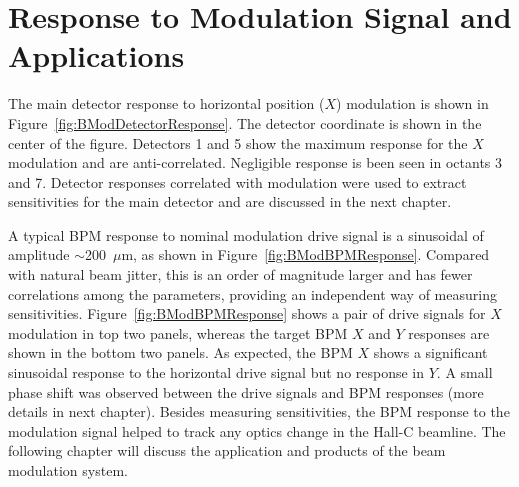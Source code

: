 \section{Response to Modulation Signal and Applications}
\label{Response to Modulation Signal and Applications}
The main detector response to horizontal position ($X$) modulation is shown in Figure~\ref{fig:BModDetectorResponse}. The detector coordinate is shown in the center of the figure. Detectors 1 and 5 show the maximum response for the $X$ modulation and are anti-correlated. Negligible response is been seen in octants 3 and 7. Detector responses correlated with modulation were used to extract sensitivities for the main detector and are discussed in the next chapter. 

A typical BPM response to nominal modulation drive signal is a sinusoidal of amplitude $\sim$200~$\mu$m, as shown in Figure~\ref{fig:BModBPMResponse}. Compared with natural beam jitter, this is an order of magnitude larger and has fewer correlations among the parameters, providing an independent way of measuring sensitivities. Figure~\ref{fig:BModBPMResponse} shows a pair of drive signals for $X$ modulation in top two panels, whereas the target BPM $X$ and $Y$ responses are shown in the bottom two panels. As expected, the BPM $X$ shows a significant sinusoidal response to the horizontal drive signal but no response in $Y$. A small phase shift was observed between the drive signals and BPM responses (more details in next chapter). Besides measuring sensitivities, the BPM response to the modulation signal helped to track any optics change in the Hall-C beamline. The following chapter will discuss the application and products of the beam modulation system.

